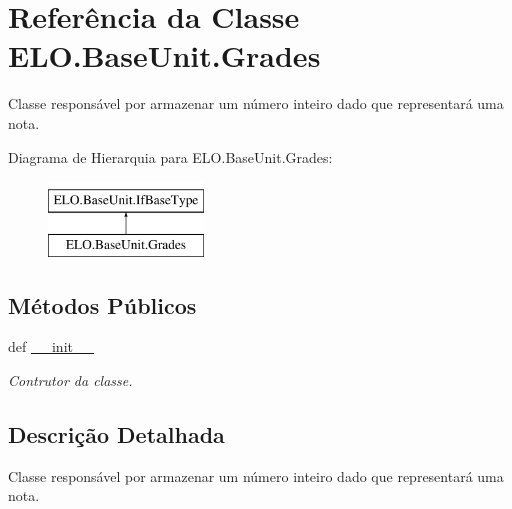 \hypertarget{classELO_1_1BaseUnit_1_1Grades}{\section{Referência da Classe E\-L\-O.\-Base\-Unit.\-Grades}
\label{classELO_1_1BaseUnit_1_1Grades}
}


Classe responsável por armazenar um número inteiro dado que representará uma nota.  


Diagrama de Hierarquia para E\-L\-O.\-Base\-Unit.\-Grades\-:\begin{figure}[H]
\begin{center}
\leavevmode
\includegraphics[height=2.000000cm]{dc/d3a/classELO_1_1BaseUnit_1_1Grades}
\end{center}
\end{figure}
\subsection*{Métodos Públicos}
\begin{DoxyCompactItemize}
\item 
def \hyperlink{classELO_1_1BaseUnit_1_1Grades_af948e06e9c08a7d99da82eae5f851839}{\-\_\-\-\_\-init\-\_\-\-\_\-}
\begin{DoxyCompactList}\small\item\em Contrutor da classe. \end{DoxyCompactList}\end{DoxyCompactItemize}


\subsection{Descrição Detalhada}
Classe responsável por armazenar um número inteiro dado que representará uma nota. 



